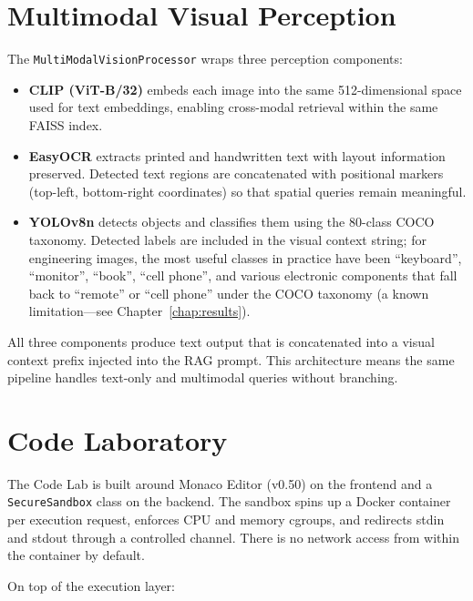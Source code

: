 \section{Multimodal Visual Perception}
\label{sec:multimodal}

The \texttt{MultiModalVisionProcessor} wraps three perception components:

\begin{itemize}
    \item \textbf{CLIP (ViT-B/32)} embeds each image into the same 512-dimensional
    space used for text embeddings, enabling cross-modal retrieval within the same
    FAISS index.

    \item \textbf{EasyOCR} extracts printed and handwritten text with layout
    information preserved. Detected text regions are concatenated with positional
    markers (top-left, bottom-right coordinates) so that spatial queries remain
    meaningful.

    \item \textbf{YOLOv8n} detects objects and classifies them using the 80-class
    COCO taxonomy. Detected labels are included in the visual context string;
    for engineering images, the most useful classes in practice have been
    ``keyboard'', ``monitor'', ``book'', ``cell phone'', and various electronic
    components that fall back to ``remote'' or ``cell phone'' under the COCO
    taxonomy (a known limitation---see Chapter~\ref{chap:results}).
\end{itemize}

All three components produce text output that is concatenated into a visual context
prefix injected into the RAG prompt. This architecture means the same pipeline
handles text-only and multimodal queries without branching.

\section{Code Laboratory}
\label{sec:codelab}

The Code Lab is built around Monaco Editor (v0.50) on the frontend and a
\texttt{SecureSandbox} class on the backend. The sandbox spins up a Docker
container per execution request, enforces CPU and memory cgroups, and redirects
stdin and stdout through a controlled channel. There is no network access from
within the container by default.

On top of the execution layer:

